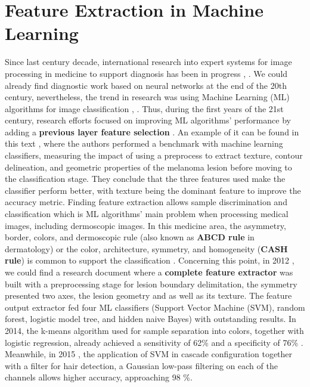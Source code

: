 \section{Feature Extraction in Machine Learning}
Since last century decade, international research into expert systems for image processing in medicine to support diagnosis has been in progress  \cite{beuscart_expert_1997}, \cite{chan_expert_1996}.  We could already find diagnostic work based on neural networks \cite{wells_medical_1998} at the end of the 20th century, nevertheless, the trend in research was using Machine Learning (ML) algorithms for image classification \cite{dreiseitl_comparison_2001}, \cite{dreiseitl_classifying_2000}. Thus, during the first years of the 21st century, research efforts focused on improving ML algorithms' performance by adding a \textbf{previous layer feature selection} \cite{lee_machine_2009}. An example of it can be found in this text \cite{garnavi_computer-aided_2012}, where the authors performed a benchmark with machine learning classifiers, measuring the impact of using a preprocess to extract texture, contour delineation, and geometric properties of the melanoma lesion before moving to the classification stage.  They conclude that the three features used make the classifier perform better, with texture being the dominant feature to improve the accuracy metric. Finding feature extraction allows sample discrimination and classification which is ML algorithms' main problem when processing medical images, including dermoscopic images. In this medicine area, the asymmetry, border, colors, and dermoscopic rule (also known as \textbf{ABCD rule} in dermatology) or the color, architecture, symmetry, and homogeneity (\textbf{CASH rule}) is common to support the classification \cite{lee_machine_2009}. Concerning this point, in 2012 \cite{6263297}, we could find a research document where a \textbf{complete feature extractor} was built with a preprocessing stage for lesion boundary delimitation, the symmetry presented two axes, the lesion geometry and as well as its texture.  The feature output extractor fed four ML classifiers (Support Vector Machine (SVM), random forest, logistic model tree, and hidden naive Bayes) with outstanding results. In 2014, the k-means algorithm used for sample separation into colors, together with logistic regression, already achieved a sensitivity of 62\% and a specificity of 76\% \cite{6803866}. Meanwhile, in 2015 \cite{abuzaghleh_noninvasive_2015}, the application of  SVM in cascade configuration together with a filter for hair detection, a Gaussian low-pass filtering on each of the channels allows higher accuracy, approaching 98 \%.

